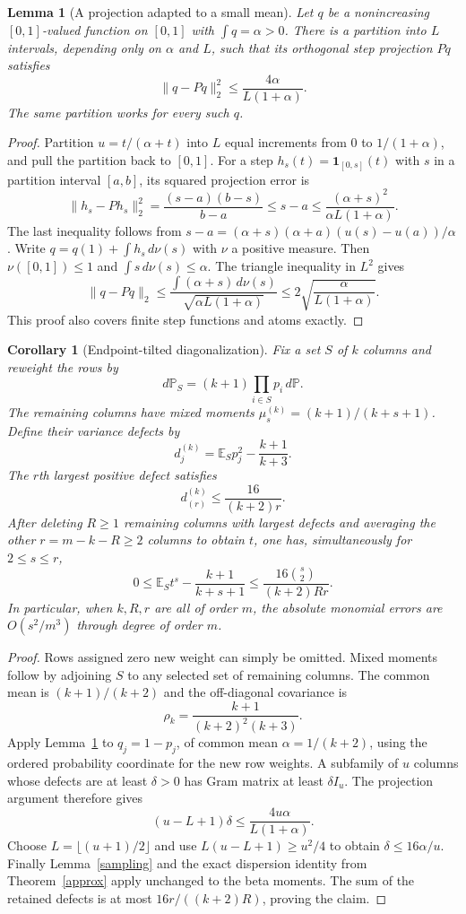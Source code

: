 \documentclass[11pt]{article}
\newtheorem{lemma}{Lemma}
\newtheorem{corollary}{Corollary}
\newcommand{\E}{\mathbb E}
\begin{document}
\begin{lemma}[A projection adapted to a small mean]\label{smallmean}
Let $q$ be a nonincreasing $[0,1]$-valued function on $[0,1]$ with
$\int q=\alpha>0$. There is a partition into $L$ intervals, depending
only on $\alpha$ and $L$, such that its orthogonal step projection $Pq$
satisfies
\[
 \|q-Pq\|_2^2\le\frac{4\alpha}{L(1+\alpha)}.
\]
The same partition works for every such $q$.
\end{lemma}
\begin{proof}
Partition $u=t/(\alpha+t)$ into $L$ equal increments from $0$ to
$1/(1+\alpha)$, and pull the partition back to $[0,1]$.
For a step $h_s(t)=\mathbf1_{[0,s]}(t)$ with $s$ in a partition
interval $[a,b]$, its squared projection error is
\[
 \|h_s-Ph_s\|_2^2
 =\frac{(s-a)(b-s)}{b-a}\le s-a
 \le\frac{(\alpha+s)^2}{\alpha L(1+\alpha)}.
\]
The last inequality follows from
$s-a=(\alpha+s)(\alpha+a)(u(s)-u(a))/\alpha$.
Write $q=q(1)+\int h_s\,d\nu(s)$ with $\nu$ a positive measure.
Then $\nu([0,1])\le1$ and $\int s\,d\nu(s)\le\alpha$.
The triangle inequality in $L^2$ gives
\[
 \|q-Pq\|_2
 \le\frac{\int(\alpha+s)\,d\nu(s)}
 {\sqrt{\alpha L(1+\alpha)}}
 \le2\sqrt{\frac{\alpha}{L(1+\alpha)}}.
\]
This proof also covers finite step functions and atoms exactly.
\end{proof}

\begin{corollary}[Endpoint-tilted diagonalization]\label{tilted}
Fix a set $S$ of $k$ columns and reweight the rows by
\[
 d\mathbb P_S=(k+1)\prod_{i\in S}p_i\,d\mathbb P.
\]
The remaining columns have mixed moments
$\mu_s^{(k)}=(k+1)/(k+s+1)$. Define their variance defects by
\[
 d_j^{(k)}=\E_S p_j^2-\frac{k+1}{k+3}.
\]
The $r$th largest positive defect satisfies
\[
 d_{(r)}^{(k)}\le\frac{16}{(k+2)r}.
\]
After deleting $R\ge1$ remaining columns with largest defects and
averaging the other $r=m-k-R\ge2$ columns to obtain $t$, one has,
simultaneously for $2\le s\le r$,
\[
 0\le\E_S t^s-\frac{k+1}{k+s+1}
 \le\frac{16\binom s2}{(k+2)Rr}.
\]
In particular, when $k,R,r$ are all of order $m$, the absolute
monomial errors are $O(s^2/m^3)$ through degree of order $m$.
\end{corollary}
\begin{proof}
Rows assigned zero new weight can simply be omitted. Mixed moments
follow by adjoining $S$ to any selected set of remaining columns.
The common mean is $(k+1)/(k+2)$ and the off-diagonal covariance is
\[
 \rho_k=\frac{k+1}{(k+2)^2(k+3)}.
\]
Apply Lemma~\ref{smallmean} to $q_j=1-p_j$, of common mean
$\alpha=1/(k+2)$, using the ordered probability coordinate for the
new row weights. A subfamily of $u$ columns whose defects are at least
$\delta>0$ has Gram matrix at least $\delta I_u$.
The projection argument therefore gives
\[
 (u-L+1)\delta\le\frac{4u\alpha}{L(1+\alpha)}.
\]
Choose $L=\lfloor(u+1)/2\rfloor$ and use
$L(u-L+1)\ge u^2/4$ to obtain $\delta\le16\alpha/u$.
Finally Lemma~\ref{sampling} and the exact dispersion identity from
Theorem~\ref{approx} apply unchanged to the beta moments. The sum of
the retained defects is at most $16r/((k+2)R)$, proving the claim.
\end{proof}
\end{document}
